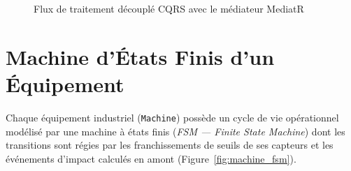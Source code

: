 \begin{figure}[htbp]
\caption{Flux de traitement découplé CQRS avec le médiateur MediatR}
\label{fig:cqrs_flow}
\end{figure}

\section{Machine d'États Finis d'un Équipement}

Chaque équipement industriel (\texttt{Machine}) possède un cycle de vie opérationnel modélisé par une machine à états finis (\textit{FSM --- Finite State Machine}) dont les transitions sont régies par les franchissements de seuils de ses capteurs et les événements d'impact calculés en amont (Figure~\ref{fig:machine_fsm}).

